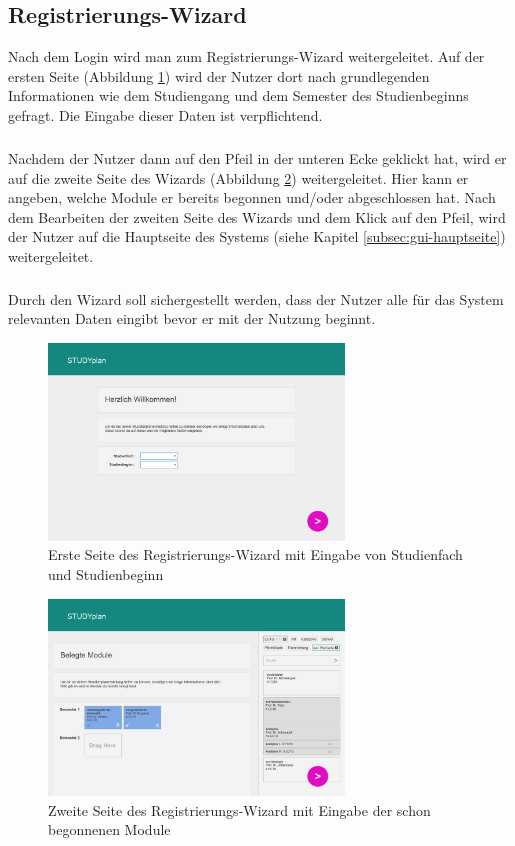 \subsection{Registrierungs-Wizard}
\label{subsec:gui-registrierung}
Nach dem Login wird man zum Registrierungs-Wizard weitergeleitet. Auf der ersten Seite (Abbildung \ref{fig:gui-registrierung-1}) wird der Nutzer dort nach grundlegenden Informationen wie dem Studiengang und dem Semester des Studienbeginns gefragt. Die Eingabe dieser Daten ist verpflichtend.
\subparagraph{}
Nachdem der Nutzer dann auf den Pfeil in der unteren Ecke geklickt hat, wird er auf die zweite Seite des Wizards (Abbildung \ref{fig:gui-registrierung-2}) weitergeleitet. Hier kann er angeben, welche Module er bereits begonnen und/oder abgeschlossen hat. 
Nach dem Bearbeiten der zweiten Seite des Wizards und dem Klick auf den Pfeil, wird der Nutzer auf die Hauptseite des Systems (siehe Kapitel \ref{subsec:gui-hauptseite}) weitergeleitet.
\subparagraph{}
Durch den Wizard soll sichergestellt werden, dass der Nutzer alle für das System relevanten Daten eingibt bevor er mit der Nutzung beginnt.
\begin{figure}[!htb]
	\caption{Erste Seite des Registrierungs-Wizard mit Eingabe von Studienfach und Studienbeginn}
	\label{fig:gui-registrierung-1}
	\centering
	\includegraphics[width=0.7\textwidth]{../GUI/ergebnisse/registrierung-1.png}
\end{figure}

\begin{figure}[!htb]
	\caption{Zweite Seite des Registrierungs-Wizard mit Eingabe der schon begonnenen Module}
	\label{fig:gui-registrierung-2}
	\centering
	\includegraphics[width=0.7\textwidth]{../GUI/ergebnisse/registrierung-2.png}
\end{figure}


